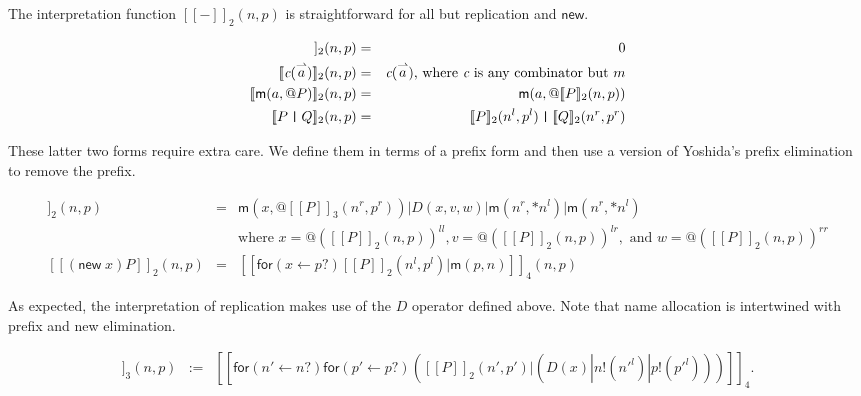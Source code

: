 \documentclass{llncs}
\makeatletter
\newcommand{\new}{\mathsf{new}}
\newcommand{\ldb}{[\![}
\newcommand{\rdb}{]\!]}
\newcommand{\id}[1]{\texttt{#1}}
\newcommand{\pzero}{\mathbin{0}}
\newcommand{\juxtap}{\mathbin{\id{|}}}
\newcommand{\binpar}[2]{#1 | #2}
\newcommand{\outputp}[2]{#1!(#2)}
\newcommand{\prefix}[3]{\mathsf{for}(#2 \leftarrow #1?) #3}
\newcommand{\quotep}[1]{\mathsf{@}#1}
\newcommand{\meaningof}[1]{\ldb #1 \rdb}
\newcommand{\vect}[1]{\stackrel{\rightharpoonup}{#1}}
\makeatother
\begin{document}
The interpretation function $\meaningof{-}_2(n, p)$ is straightforward
for all but replication and $\mathsf{new}$.

\begin{eqnarray*}
    \meaningof{\pzero}_2 (n,p)
      & = &
       \pzero \\
    \meaningof{\emph{c}(\vect{a})}_2 (n,p) 
      & = & 
      \emph{c}(\vect{a})\mbox{, where $\emph{c}$ is any combinator but $m$} \\
    \meaningof{\mathsf{m}(a,\quotep{P})}_2 (n,p) 
      & = & 
          \mathsf{m}(a, \quotep{\meaningof{P}}_2 (n,p)) \\
    \meaningof{P \juxtap Q}_2 (n,p) 
      & = & 
    \meaningof{P}_2 (n^l, p^l)
         \juxtap \meaningof{Q}_2 (n^r, p^r) \\ 
\end{eqnarray*}

These latter two forms require extra care. We define them in terms of
a prefix form and then use a version of Yoshida's prefix elimination
to remove the prefix.

\begin{eqnarray*}
    \meaningof{\mathsf{*} P}_2 (n,p)
          & = & \binpar{\mathsf{m}(x, \quotep{\meaningof{P}_3(n^r,p^r)})}
                  {\binpar{D(x,v,w)}
                    {\binpar{\mathsf{m}(n^r, *n^l)}{\mathsf{m}(n^r, *n^l)}}} \\
                  & & \mbox{where } 
                      x = @(\meaningof{P}_2(n,p))^{ll}, 
                      v = @(\meaningof{P}_2(n,p))^{lr}, \mbox{ and }
                      w = @(\meaningof{P}_2(n,p))^{rr} \\
    \meaningof{(\new \; x ) P}_2 (n, p) 
          & = & 
         \meaningof{\prefix{p}{x}{\binpar{\meaningof{P}_2 ( n^l, p^l )}{\mathsf{m}(p, n)}}}_4(n, p)
\end{eqnarray*}

As expected, the interpretation of replication makes use of the $D$
operator defined above. Note that name allocation is intertwined with
prefix and new elimination.
         
\begin{eqnarray*}
  \meaningof{P}_3(n, p) 
    & := & 
      \meaningof{\prefix{n}{n'}{\prefix{p}{p'}{(\binpar{\meaningof{P}_2(n',p')}
        {(\binpar{D(x)}{\binpar{\outputp{n}{n'^l}}{\outputp{p}{p'^l}}})})}}}_4. \\
\end{eqnarray*}
\end{document}
